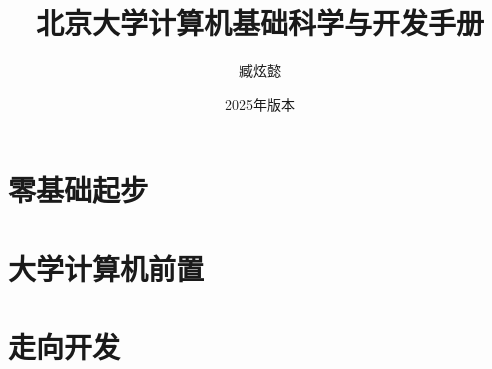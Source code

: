 \documentclass[12pt, openany]{book}
\title{\Huge\textbf{北京大学计算机基础科学与开发手册}}
\author[a]{臧炫懿}
\affil[a]{北京大学信息科学技术学院、北京大学学生Linux俱乐部}
\date{2025年版本}
\begin{document}
\maketitle

\frontmatter



\mainmatter

\tableofcontents


\part{零基础起步}









\part{大学计算机前置}









\part{走向开发}

\backmatter


\end{document}
